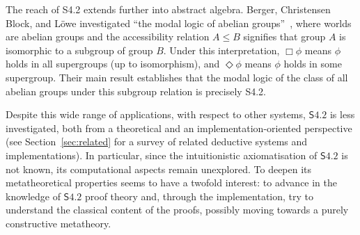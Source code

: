 \documentclass{article}
\newcommand{\logic}{\mathsf{S4.2}}
\theoremstyle{definition}
\begin{document}
The reach of S4.2 extends further into abstract algebra. Berger, Christensen Block, and L\"owe investigated ``the modal logic of abelian groups''~\cite{Berger2023:ModalAbelian}, where worlds are abelian groups and the accessibility relation $A \leq B$ signifies that group $A$ is isomorphic to a subgroup of group $B$. Under this interpretation, $\Box\phi$ means $\phi$ holds in all supergroups (up to isomorphism), and $\Diamond\phi$ means $\phi$ holds in some supergroup. Their main result establishes that the modal logic of the class of all abelian groups under this subgroup relation is precisely S4.2. %

Despite this wide range of applications, with respect to other systems, $\logic$ is less investigated, both from a theoretical and an implementation-oriented perspective (see Section~\ref{sec:related} for a survey of related deductive systems and implementations). In particular, since the intuitionistic axiomatisation of $\logic$ is not known, its computational aspects remain unexplored. To deepen its metatheoretical properties seems to have a twofold interest: to advance in the knowledge of $\logic$ proof theory and, through the implementation, try to understand the classical content of the proofs, possibly moving towards a purely constructive metatheory.
\end{document}
